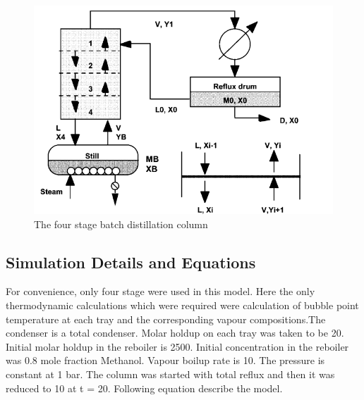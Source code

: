 \documentclass[12pt]{report}
\begin{document}
\begin{figure}
\centering
\includegraphics[width=1\linewidth]{Ingham1}
\caption{The four stage batch distillation column \cite{ingham}}
\label{Ingham1}
\end{figure}

\subsection{Simulation Details and Equations}
For convenience, only four stage were used in this model. Here the only thermodynamic calculations which were required were calculation of bubble point temperature at each tray and the corresponding vapour compositions.The condenser is a total condenser. Molar holdup on each tray was taken to be 20. Initial molar holdup in the reboiler is 2500. Initial concentration in the reboiler was 0.8 mole fraction Methanol. Vapour boilup rate is 10. The pressure is constant at 1 bar. The column was started with total reflux and then it was
reduced to 10 at t = 20. Following equation describe the model.
\end{document}
